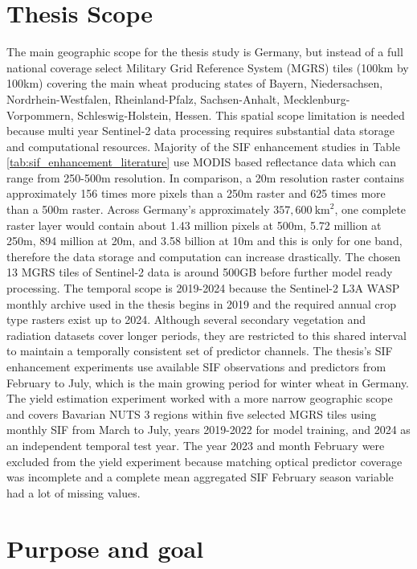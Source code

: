 \section{Thesis Scope}

The main geographic scope for the thesis study is Germany, but instead of a full national coverage select Military Grid Reference System (MGRS) tiles (100km by 100km) covering the main wheat producing states of Bayern, Niedersachsen, Nordrhein-Westfalen, Rheinland-Pfalz, Sachsen-Anhalt, Mecklenburg-Vorpommern, Schleswig-Holstein, Hessen. This spatial scope limitation is needed because multi year Sentinel-2 data processing requires substantial data storage and computational resources. Majority of the SIF enhancement studies in Table \ref{tab:sif_enhancement_literature} use MODIS based reflectance data which can range from 250-500m resolution. In comparison, a 20m resolution raster contains approximately 156 times more pixels than a 250m raster and 625 times more than a 500m raster. Across Germany’s approximately \(357{,}600~\mathrm{km}^2\), one complete raster layer would contain about 1.43 million pixels at 500m, 5.72 million at 250m, 894 million at 20m, and 3.58 billion at 10m and this is only for one band, therefore the data storage and computation can increase drastically. The chosen 13 MGRS tiles of Sentinel-2 data is around 500GB before further model ready processing. The temporal scope is 2019-2024 because the Sentinel-2 L3A WASP monthly archive used in the thesis begins in 2019 and the required annual crop type rasters exist up to 2024. Although several secondary vegetation and radiation datasets cover longer periods, they are restricted to this shared interval to maintain a temporally consistent set of predictor channels. The thesis's SIF enhancement experiments use available SIF observations and predictors from February to July, which is the main growing period for winter wheat in Germany. The yield estimation experiment worked with a more narrow geographic scope and covers Bavarian NUTS 3 regions within five selected MGRS tiles using monthly SIF from March to July, years 2019-2022 for model training, and 2024 as an independent temporal test year. The year 2023 and month February were excluded from the yield experiment because matching optical predictor coverage was incomplete and a complete mean aggregated SIF February season variable had a lot of missing values.

\section{Purpose and goal\label{sec:purpose_and_goal}}

